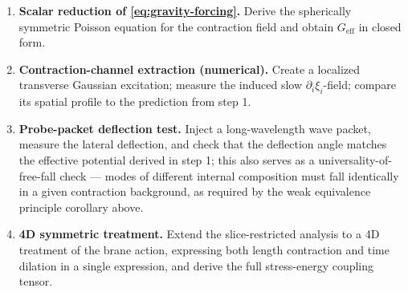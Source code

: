 \begin{enumerate}
  \item \textbf{Scalar reduction of \eqref{eq:gravity-forcing}.}
  Derive the spherically symmetric Poisson equation for the contraction field and obtain
  $G_{\text{eff}}$ in closed form.

  \item \textbf{Contraction-channel extraction (numerical).}
  Create a localized transverse Gaussian excitation; measure the induced slow
  $\partial_i\xi_i$-field; compare its spatial profile to the prediction from step 1.

  \item \textbf{Probe-packet deflection test.}
  Inject a long-wavelength wave packet, measure the lateral deflection, and check that the
  deflection angle matches the effective potential derived in step 1; this also serves as a
  universality-of-free-fall check --- modes of different internal composition must fall
  identically in a given contraction background, as required by the weak equivalence principle
  corollary above.

  \item \textbf{4D symmetric treatment.}
  Extend the slice-restricted analysis to a 4D treatment of the brane action, expressing both
  length contraction and time dilation in a single expression, and derive the full stress-energy
  coupling tensor.
\end{enumerate}